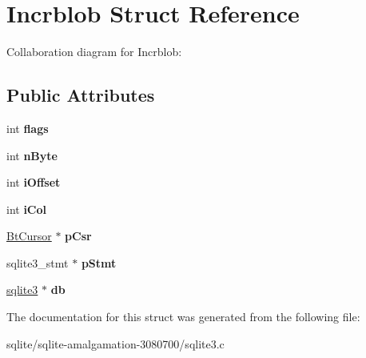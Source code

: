 \hypertarget{struct_incrblob}{\section{Incrblob Struct Reference}
\label{struct_incrblob}
}


Collaboration diagram for Incrblob\+:
\subsection*{Public Attributes}
\begin{DoxyCompactItemize}
\item 
\hypertarget{struct_incrblob_a46fa093e5241305f28d02926f8d0846f}{int {\bfseries flags}}\label{struct_incrblob_a46fa093e5241305f28d02926f8d0846f}

\item 
\hypertarget{struct_incrblob_ab1e1439df086208173fa97003f0ee02b}{int {\bfseries n\+Byte}}\label{struct_incrblob_ab1e1439df086208173fa97003f0ee02b}

\item 
\hypertarget{struct_incrblob_af8e71744f43178967460b9f402e7fafd}{int {\bfseries i\+Offset}}\label{struct_incrblob_af8e71744f43178967460b9f402e7fafd}

\item 
\hypertarget{struct_incrblob_a398a322b061fb9952bc155026976ba51}{int {\bfseries i\+Col}}\label{struct_incrblob_a398a322b061fb9952bc155026976ba51}

\item 
\hypertarget{struct_incrblob_af5a24b18473d1449c8c3fe7d826de59a}{\hyperlink{struct_bt_cursor}{Bt\+Cursor} $\ast$ {\bfseries p\+Csr}}\label{struct_incrblob_af5a24b18473d1449c8c3fe7d826de59a}

\item 
\hypertarget{struct_incrblob_a8b7b39c9372db552add74c69f14a61a3}{sqlite3\+\_\+stmt $\ast$ {\bfseries p\+Stmt}}\label{struct_incrblob_a8b7b39c9372db552add74c69f14a61a3}

\item 
\hypertarget{struct_incrblob_a9d3fe0b0229b75b9d0f9ee8e6545b5bc}{\hyperlink{structsqlite3}{sqlite3} $\ast$ {\bfseries db}}\label{struct_incrblob_a9d3fe0b0229b75b9d0f9ee8e6545b5bc}

\end{DoxyCompactItemize}


The documentation for this struct was generated from the following file\+:\begin{DoxyCompactItemize}
\item 
sqlite/sqlite-\/amalgamation-\/3080700/sqlite3.\+c\end{DoxyCompactItemize}
